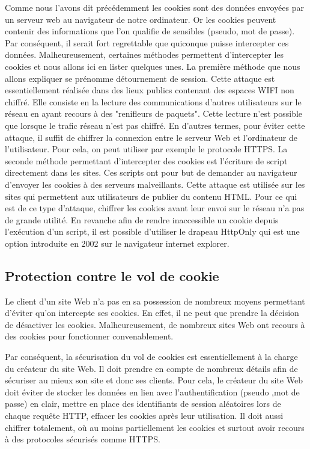 Comme nous l’avons dit précédemment les cookies sont des données envoyées par un serveur web au navigateur de notre ordinateur. Or les cookies peuvent contenir des informations que l’on qualifie de sensibles (pseudo, mot de passe). Par conséquent, il serait fort regrettable que quiconque puisse intercepter ces données.
Malheureusement, certaines méthodes permettent d’intercepter les cookies et nous allons ici en lister quelques unes.
La première méthode que nous allons expliquer se prénomme détournement de session. Cette attaque est essentiellement réalisée dans des lieux publics contenant des espaces WIFI non chiffré. Elle consiste en la lecture des communications d’autres utilisateurs sur le réseau en ayant recours à des "renifleurs de paquets". Cette lecture n’est possible que lorsque le trafic réseau n’est pas chiffré. En d’autres termes, pour éviter cette attaque, il suffit de chiffrer la connexion entre le serveur Web et l’ordinateur de l’utilisateur. Pour cela, on peut utiliser par exemple le protocole HTTPS.
La seconde méthode permettant d'intercepter des cookies est l’écriture de script directement dans les sites. Ces scripts ont pour but de demander au navigateur d’envoyer les cookies à des serveurs malveillants. Cette attaque est utilisée sur les sites qui permettent aux utilisateurs de publier du contenu HTML. Pour ce qui est de ce type d’attaque, chiffrer les cookies avant leur envoi sur le réseau n’a pas de grande utilité. En revanche afin de rendre inaccessible un cookie depuis l’exécution d’un script, il est possible d’utiliser le drapeau HttpOnly qui est une option introduite en 2002 sur le navigateur internet explorer.

\subsection{Protection contre le vol de cookie}

Le client d’un site Web n’a pas en sa possession de nombreux moyens permettant d’éviter qu’on intercepte ses cookies. En effet, il ne peut que prendre la décision de désactiver les cookies. Malheureusement, de nombreux sites Web ont recours à des cookies pour fonctionner convenablement.

Par conséquent, la sécurisation du vol de cookies est essentiellement à la charge du créateur du site Web. Il doit prendre en compte de nombreux détails afin de sécuriser au mieux son site et donc ses clients. Pour cela, le créateur du site Web doit éviter de stocker les données en lien avec l’authentification (pseudo ,mot de passe) en clair, mettre en place des identifiants de session aléatoires lors de chaque requête HTTP, effacer les cookies après leur utilisation. Il doit aussi chiffrer totalement, où au moins partiellement les cookies et surtout avoir recours à des protocoles sécurisés comme HTTPS.



